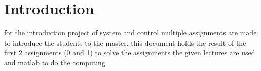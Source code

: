\documentclass[report.tex]{subfiles}
\begin{document}
\chapter{Introduction}
for the introduction project of system and control multiple assignments are made to introduce the students to the master.
this document holds the result of the first 2 assignments (0 and 1)
to solve the assignments the given lectures are used and matlab to do the computing
\end{document}
